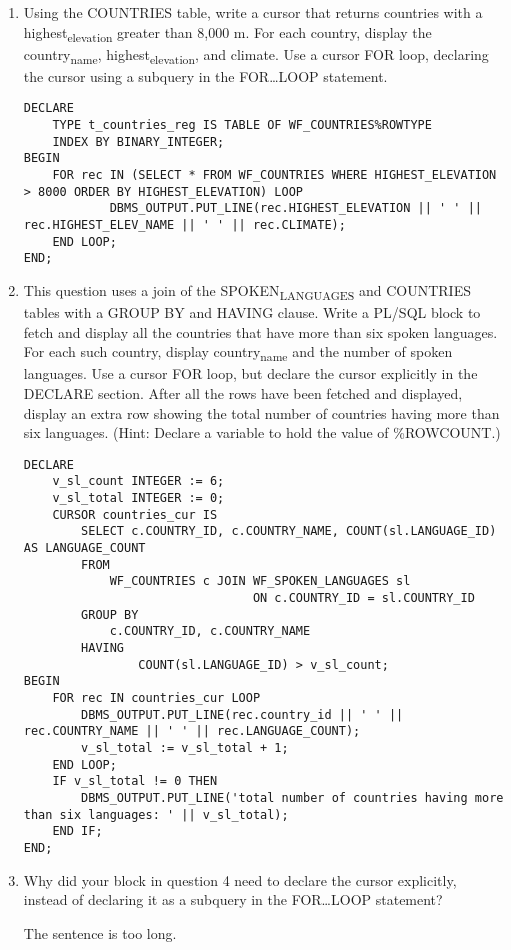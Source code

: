 \documentclass[11pt]{article}
\begin{document}
\begin{enumerate}
\item Using the COUNTRIES table, write a cursor that returns countries with a highest\textsubscript{elevation} greater than 8,000 m. For each country, display the country\textsubscript{name}, highest\textsubscript{elevation}, and climate. Use a cursor FOR loop, declaring the cursor using a subquery in the FOR…LOOP statement.
\begin{verbatim}
DECLARE
    TYPE t_countries_reg IS TABLE OF WF_COUNTRIES%ROWTYPE
    INDEX BY BINARY_INTEGER;
BEGIN
    FOR rec IN (SELECT * FROM WF_COUNTRIES WHERE HIGHEST_ELEVATION > 8000 ORDER BY HIGHEST_ELEVATION) LOOP
            DBMS_OUTPUT.PUT_LINE(rec.HIGHEST_ELEVATION || ' ' || rec.HIGHEST_ELEV_NAME || ' ' || rec.CLIMATE);
    END LOOP;
END;
\end{verbatim}
\item This question uses a join of the SPOKEN\textsubscript{LANGUAGES} and COUNTRIES tables with a GROUP BY and HAVING clause. Write a PL/SQL block to fetch and display all the countries that have more than six spoken languages. For each such country, display country\textsubscript{name} and the number of spoken languages. Use a cursor FOR loop, but declare the cursor explicitly in the DECLARE section. After all the rows have been fetched and displayed, display an extra row showing the total number of countries having more than six languages. (Hint: Declare a variable to hold the value of \%ROWCOUNT.)
\begin{verbatim}
DECLARE
    v_sl_count INTEGER := 6;
    v_sl_total INTEGER := 0;
    CURSOR countries_cur IS
        SELECT c.COUNTRY_ID, c.COUNTRY_NAME, COUNT(sl.LANGUAGE_ID) AS LANGUAGE_COUNT
        FROM
            WF_COUNTRIES c JOIN WF_SPOKEN_LANGUAGES sl
                                ON c.COUNTRY_ID = sl.COUNTRY_ID
        GROUP BY
            c.COUNTRY_ID, c.COUNTRY_NAME
        HAVING
                COUNT(sl.LANGUAGE_ID) > v_sl_count;
BEGIN
    FOR rec IN countries_cur LOOP
        DBMS_OUTPUT.PUT_LINE(rec.country_id || ' ' || rec.COUNTRY_NAME || ' ' || rec.LANGUAGE_COUNT);
        v_sl_total := v_sl_total + 1;
    END LOOP;
    IF v_sl_total != 0 THEN
        DBMS_OUTPUT.PUT_LINE('total number of countries having more than six languages: ' || v_sl_total);
    END IF;
END;
\end{verbatim}
\item Why did your block in question 4 need to declare the cursor explicitly, instead of declaring it as a subquery in the FOR…LOOP statement?

The sentence is too long.
\end{enumerate}
\end{document}
